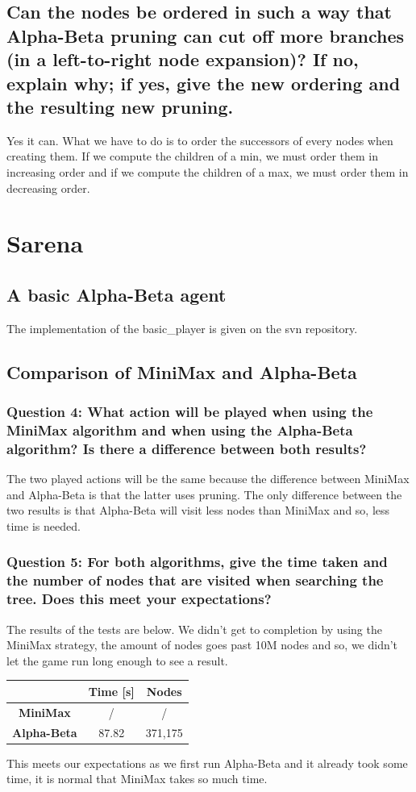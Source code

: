 \documentclass[a4paper,10pt]{article}
\begin{document}
		\subsection{Can the nodes be ordered in such a way that Alpha-Beta pruning can cut off more branches (in a left-to-right node expansion)? If no, explain why; if yes,
give the new ordering and the resulting new pruning.}
		Yes it can. What we have to do is to order the successors of every nodes when creating them. If we compute the children of a min, we must order them in increasing order and if we compute the children of a max, we must order them in decreasing order.
	\section{Sarena}
		\subsection{A basic Alpha-Beta agent}
			The implementation of the basic\_player is given on the svn repository.
		\subsection{Comparison of MiniMax and Alpha-Beta}
			\subsubsection{Question 4: What action will be played when using the MiniMax algorithm and when using the Alpha-Beta algorithm? Is there a difference between both results?}
			The two played actions will be the same because the difference between MiniMax and Alpha-Beta is that the latter uses pruning. The only difference between the two results is that Alpha-Beta will visit less nodes than MiniMax and so, less time is needed.
			\subsubsection{Question 5: For both algorithms, give the time taken and the number of nodes that are visited when searching the tree. Does this meet your expectations?}
				The results of the tests are below. We didn't get to completion by using the MiniMax strategy, the amount of nodes goes past 10M nodes and so, we didn't let the game run long enough to see a result.
				\begin{center}
					\begin{tabular}{|c||c|c|}
						\hline 
						 & \textbf{Time [s]} & \textbf{Nodes} \\ 
						\hline 
						\textbf{MiniMax} & / & / \\ 
						\hline 
						\textbf{Alpha-Beta} & 87.82 & 371,175 \\
						\hline 
					\end{tabular}
				\end{center} 
				This meets our expectations as we first run Alpha-Beta and it already took some time, it is normal that MiniMax takes so much time.
\end{document}

